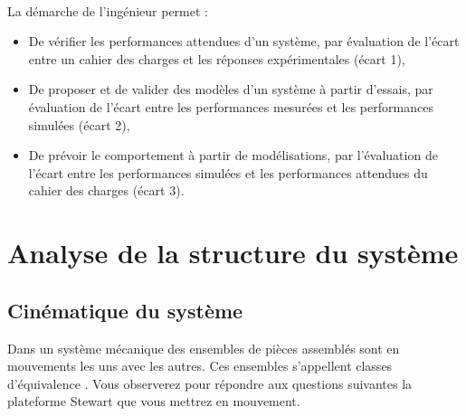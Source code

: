 

 \\

\graphicspath{{../../../img/}}
\begin{center}
\def\svgwidth{\columnwidth}

\end{center}

La démarche de l’ingénieur permet :
\begin{itemize}
 \item De vérifier les performances attendues d’un système, par évaluation de l’écart entre un cahier des charges et les réponses expérimentales (écart 1),
 \item De proposer et de valider des modèles d’un système à partir d’essais, par évaluation de l’écart entre les performances mesurées et les performances simulées (écart 2),
 \item De prévoir le comportement à partir de modélisations, par l’évaluation de l’écart entre les performances simulées et les performances attendues du cahier des charges (écart 3).
\end{itemize}



\newpage

\section{Analyse de la structure du système}

\subsection{Cinématique du système}

Dans un système mécanique des ensembles de pièces assemblés sont en mouvements les uns avec les autres. Ces ensembles s'appellent \og classes d'équivalence \fg. Vous observerez pour répondre aux questions suivantes la plateforme Stewart que vous mettrez en mouvement.


